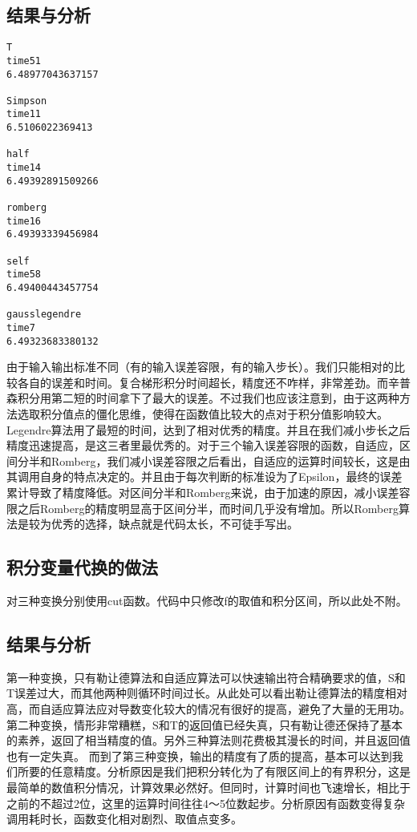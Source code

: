 \documentclass[a4paper,11pt,onecolumn,twoside]{article}
\begin{document}
\subsection{结果与分析}
\begin{lstlisting}
T
time51
6.48977043637157

Simpson
time11
6.5106022369413

half
time14
6.49392891509266

romberg
time16
6.49393339456984

self
time58
6.49400443457754

gausslegendre
time7
6.49323683380132

\end{lstlisting}
由于输入输出标准不同（有的输入误差容限，有的输入步长）。我们只能相对的比较各自的误差和时间。复合梯形积分时间超长，精度还不咋样，非常差劲。而辛普森积分用第二短的时间拿下了最大的误差。不过我们也应该注意到，由于这两种方法选取积分值点的僵化思维，使得在函数值比较大的点对于积分值影响较大。Legendre算法用了最短的时间，达到了相对优秀的精度。并且在我们减小步长之后精度迅速提高，是这三者里最优秀的。对于三个输入误差容限的函数，自适应，区间分半和Romberg，我们减小误差容限之后看出，自适应的运算时间较长，这是由其调用自身的特点决定的。并且由于每次判断的标准设为了Epsilon，最终的误差累计导致了精度降低。对区间分半和Romberg来说，由于加速的原因，减小误差容限之后Romberg的精度明显高于区间分半，而时间几乎没有增加。所以Romberg算法是较为优秀的选择，缺点就是代码太长，不可徒手写出。
\subsection{积分变量代换的做法}
对三种变换分别使用cut函数。代码中只修改f的取值和积分区间，所以此处不附。
\subsection{结果与分析}
第一种变换，只有勒让德算法和自适应算法可以快速输出符合精确要求的值，S和T误差过大，而其他两种则循环时间过长。从此处可以看出勒让德算法的精度相对高，而自适应算法应对导数变化较大的情况有很好的提高，避免了大量的无用功。
第二种变换，情形非常糟糕，S和T的返回值已经失真，只有勒让德还保持了基本的素养，返回了相当精度的值。另外三种算法则花费极其漫长的时间，并且返回值也有一定失真。
而到了第三种变换，输出的精度有了质的提高，基本可以达到我们所要的任意精度。分析原因是我们把积分转化为了有限区间上的有界积分，这是最简单的数值积分情况，计算效果必然好。但同时，计算时间也飞速增长，相比于之前的不超过2位，这里的运算时间往往4～5位数起步。分析原因有函数变得复杂调用耗时长，函数变化相对剧烈、取值点变多。
\end{document}
